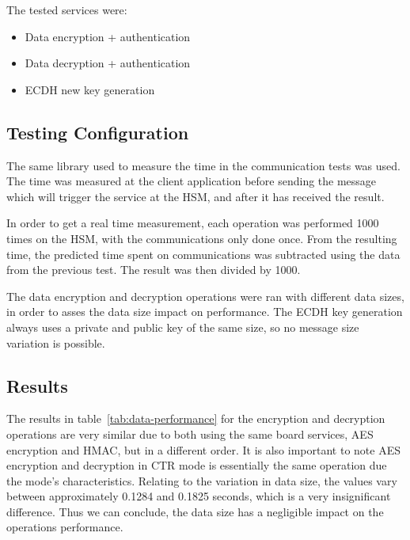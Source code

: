 The tested services were:
\begin{itemize}
	\item Data encryption + authentication
	\item Data decryption + authentication
	\item ECDH new key generation
\end{itemize}

\subsection{Testing Configuration}\label{chap:evaluation:services:config}

The same library used to measure the time in the communication tests was used.
The time was measured at the client application before sending the message which will trigger the service at the HSM, and after it has received the result.

In order to get a real time measurement, each operation was performed 1000 times on the HSM, with the communications only done once.
From the resulting time, the predicted time spent on communications was subtracted using the data from the previous test. The result was then divided by 1000.

The data encryption and decryption operations were ran with different data sizes, in order to asses the data size impact on performance.
The ECDH key generation always uses a private and public key of the same size, so no message size variation is possible.

\subsection{Results}\label{chap:evaluation:services:results}



The results in table~\ref{tab:data-performance} for the encryption and decryption operations are very similar due to both using the same board services, AES encryption and HMAC, but in a different order. It is also important to note AES encryption and decryption in CTR mode is essentially the same operation due the mode's characteristics.
Relating to the variation in data size, the values vary between approximately 0.1284 and 0.1825 seconds, which is a very insignificant difference. Thus we can conclude, the data size has a negligible impact on the operations performance.

